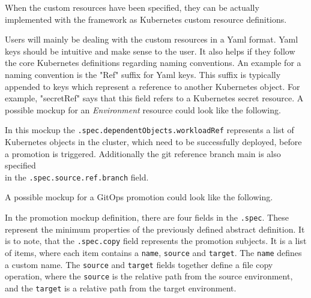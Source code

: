
When the custom resources have been specified,
they can be actually implemented with the framework
as Kubernetes custom resource definitions.

Users will mainly be dealing with the custom resources in a Yaml format.
Yaml keys should be intuitive and make sense to the user.
It also helps if they follow the core Kubernetes definitions regarding naming conventions.
An example for a naming convention is the "Ref" suffix for Yaml keys.
This suffix is typically appended to keys which represent a reference to another Kubernetes
object.
For example, "secretRef" says that this field refers to a Kubernetes secret resource.
A possible mockup for an \textit{Environment} resource
could look like the following.



In this mockup the \lstinline|.spec.dependentObjects.workloadRef|
represents a list of Kubernetes objects in the cluster,
which need to be successfully deployed,
before a promotion is triggered.
Additionally the git reference branch main is also specified \\
in the \lstinline|.spec.source.ref.branch| field.

A possible mockup for a GitOps promotion 
could look like the following.



In the promotion mockup definition,
there are four fields in the
\lstinline|.spec|.
These represent the minimum properties of the previously defined abstract definition.
It is to note, that
the \lstinline|.spec.copy| field represents the promotion subjects.
It is a list of items, where each item contains
a \lstinline|name|, \lstinline|source| and \lstinline|target|.
The \lstinline|name| defines a custom name.
The \lstinline|source| and \lstinline|target| fields together define a
file copy operation,
where the \lstinline|source| is the relative path from the source environment,
and the \lstinline|target| is a relative path from the target environment.

